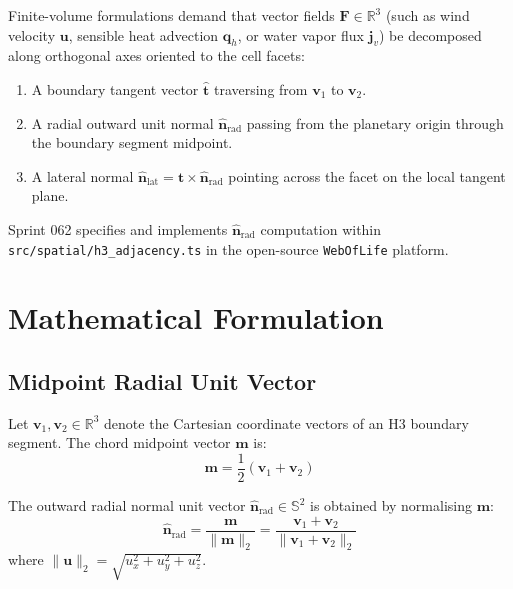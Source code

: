 \documentclass[10pt,journal,compsoc]{IEEEtran}
\begin{document}
Finite-volume formulations demand that vector fields $\mathbf{F} \in \mathbb{R}^3$ (such as wind velocity $\mathbf{u}$, sensible heat advection $\mathbf{q}_h$, or water vapor flux $\mathbf{j}_v$) be decomposed along orthogonal axes oriented to the cell facets:
\begin{enumerate}
    \item A boundary tangent vector $\hat{\mathbf{t}}$ traversing from $\mathbf{v}_1$ to $\mathbf{v}_2$.
    \item A radial outward unit normal $\hat{\mathbf{n}}_{\text{rad}}$ passing from the planetary origin through the boundary segment midpoint.
    \item A lateral normal $\hat{\mathbf{n}}_{\text{lat}} = \hat{\mathbf{t}} \times \hat{\mathbf{n}}_{\text{rad}}$ pointing across the facet on the local tangent plane.
\end{enumerate}

Sprint 062 specifies and implements $\hat{\mathbf{n}}_{\text{rad}}$ computation within \texttt{src/spatial/h3\_adjacency.ts} in the open-source \texttt{WebOfLife} platform.

\section{Mathematical Formulation}

\subsection{Midpoint Radial Unit Vector}
Let $\mathbf{v}_1, \mathbf{v}_2 \in \mathbb{R}^3$ denote the Cartesian coordinate vectors of an H3 boundary segment. The chord midpoint vector $\mathbf{m}$ is:
\begin{equation}
\mathbf{m} = \frac{1}{2}(\mathbf{v}_1 + \mathbf{v}_2)
\end{equation}

The outward radial normal unit vector $\hat{\mathbf{n}}_{\text{rad}} \in \mathbb{S}^2$ is obtained by normalising $\mathbf{m}$:
\begin{equation}
\hat{\mathbf{n}}_{\text{rad}} = \frac{\mathbf{m}}{\|\mathbf{m}\|_2} = \frac{\mathbf{v}_1 + \mathbf{v}_2}{\|\mathbf{v}_1 + \mathbf{v}_2\|_2}
\end{equation}
where $\|\mathbf{u}\|_2 = \sqrt{u_x^2 + u_y^2 + u_z^2}$.
\end{document}
